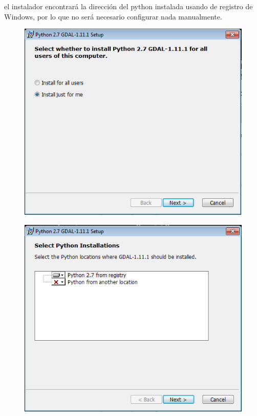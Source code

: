 \documentclass[11pt, spanish]{memoir}
\begin{document}
el instalador encontrará la dirección del python instalada usando de registro de Windows, por lo que no será necesario configurar nada manualmente.

\begin{figure}[H]
\centering
\includegraphics[width=14cm]{bindings1.png}
\end{figure}

\begin{figure}[H]
\centering
\includegraphics[width=14cm]{bindings2.png}
\end{figure}
\end{document}
